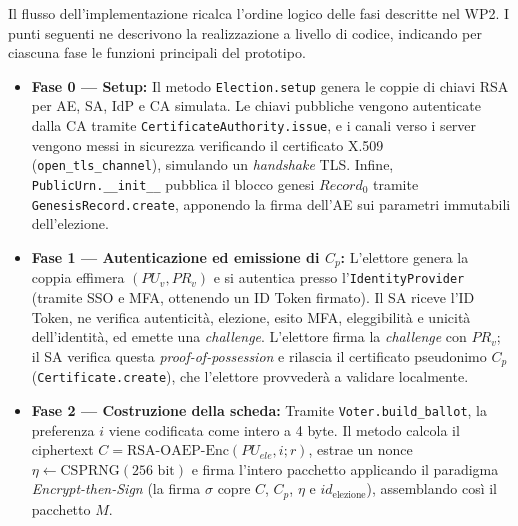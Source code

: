 Il flusso dell'implementazione ricalca l'ordine logico delle fasi descritte nel WP2. I punti seguenti ne descrivono la realizzazione a livello di codice, indicando per ciascuna fase le funzioni principali del prototipo.

\begin{itemize}
  \item \textbf{Fase 0 --- Setup:} Il metodo \texttt{Election.setup} genera le coppie di chiavi RSA per AE, SA, IdP e CA simulata. Le chiavi pubbliche vengono autenticate dalla CA tramite \texttt{CertificateAuthority.issue}, e i canali verso i server vengono messi in sicurezza verificando il certificato X.509 (\texttt{open\_tls\_channel}), simulando un \emph{handshake} TLS. Infine, \texttt{PublicUrn.\_\_init\_\_} pubblica il blocco genesi $\mathit{Record}_0$ tramite \texttt{GenesisRecord.create}, apponendo la firma dell'AE sui parametri immutabili dell'elezione.

  \item \textbf{Fase 1 --- Autenticazione ed emissione di $C_p$:} L'elettore genera la coppia effimera $(PU_v, PR_v)$ e si autentica presso l'\texttt{IdentityProvider} (tramite SSO e MFA, ottenendo un ID Token firmato). Il SA riceve l'ID Token, ne verifica autenticità, elezione, esito MFA, eleggibilità e unicità dell'identità, ed emette una \emph{challenge}. L'elettore firma la \emph{challenge} con $PR_v$; il SA verifica questa \emph{proof-of-possession} e rilascia il certificato pseudonimo $C_p$ (\texttt{Certificate.create}), che l'elettore provvederà a validare localmente.

  \item \textbf{Fase 2 --- Costruzione della scheda:} Tramite \texttt{Voter.build\_ballot}, la preferenza $i$ viene codificata come intero a 4 byte. Il metodo calcola il ciphertext $C = \text{RSA-OAEP-Enc}(PU_{ele}, i; r)$, estrae un nonce $\eta \leftarrow \text{CSPRNG}(256\text{~bit})$ e firma l'intero pacchetto applicando il paradigma \emph{Encrypt-then-Sign} (la firma $\sigma$ copre $C$, $C_p$, $\eta$ e $id_{\text{elezione}}$), assemblando così il pacchetto $M$.


\end{itemize}
